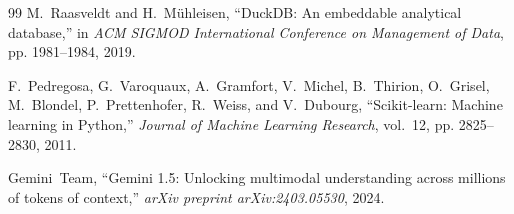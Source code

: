\documentclass[10pt,journal,compsoc]{IEEEtran}
\begin{document}
\begin{thebibliography}{99}
M.~Raasveldt and H.~M{\"u}hleisen, ``DuckDB: An embeddable analytical database,'' in \emph{ACM SIGMOD International Conference on Management of Data}, pp. 1981--1984, 2019.

F.~Pedregosa, G.~Varoquaux, A.~Gramfort, V.~Michel, B.~Thirion, O.~Grisel, M.~Blondel, P.~Prettenhofer, R.~Weiss, and V.~Dubourg, ``Scikit-learn: Machine learning in Python,'' \emph{Journal of Machine Learning Research}, vol.~12, pp. 2825--2830, 2011.

Gemini~Team, ``Gemini 1.5: Unlocking multimodal understanding across millions of tokens of context,'' \emph{arXiv preprint arXiv:2403.05530}, 2024.

\end{thebibliography}
\end{document}
